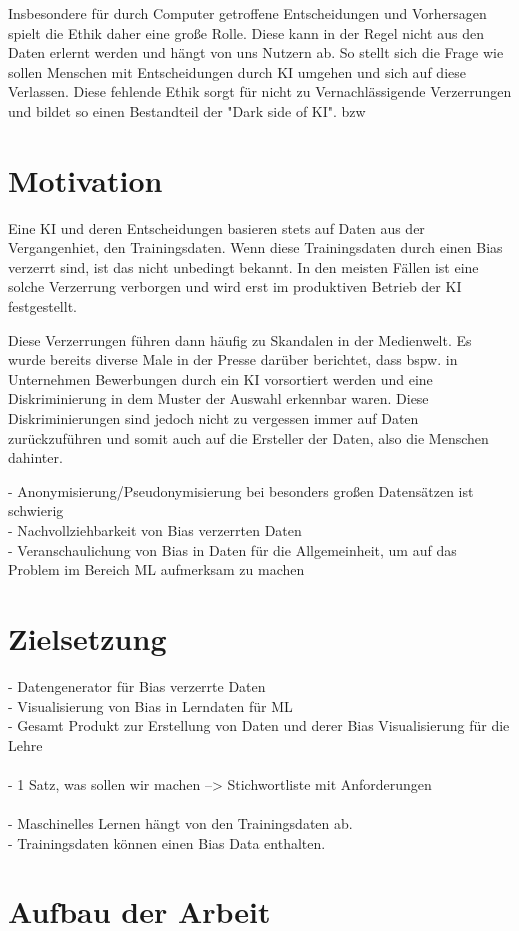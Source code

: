 \begin{onehalfspace}
        Insbesondere für durch Computer getroffene Entscheidungen und Vorhersagen spielt die Ethik daher eine große Rolle. Diese kann in der Regel nicht aus den Daten erlernt werden und hängt von uns Nutzern ab. So stellt sich die Frage wie sollen Menschen mit Entscheidungen durch \ac*{KI} umgehen und sich auf diese Verlassen. Diese fehlende Ethik sorgt für nicht zu Vernachlässigende Verzerrungen und bildet so einen Bestandteil der "Dark side of KI". \ac{bzw}

        \section{Motivation}
        \label{subsec:motivation}
        Eine \ac*{KI} und deren Entscheidungen basieren stets auf Daten aus der Vergangenhiet, den Trainingsdaten. Wenn diese Trainingsdaten durch einen Bias verzerrt sind, ist das nicht unbedingt bekannt. In den meisten Fällen ist eine solche Verzerrung verborgen und wird erst im produktiven Betrieb der \ac*{KI} festgestellt.
        
        Diese Verzerrungen führen dann häufig zu Skandalen in der Medienwelt. Es wurde bereits diverse Male in der Presse darüber berichtet, dass bspw. in Unternehmen Bewerbungen durch ein \ac*{KI} vorsortiert werden und eine Diskriminierung in dem Muster der Auswahl erkennbar waren. Diese Diskriminierungen sind jedoch nicht zu vergessen immer auf Daten zurückzuführen und somit auch auf die Ersteller der Daten, also die Menschen dahinter.

        -	Anonymisierung/Pseudonymisierung bei besonders gro{\ss}en Datensätzen ist schwierig \\
        -	Nachvollziehbarkeit von Bias verzerrten Daten \\
        -	Veranschaulichung von Bias in Daten für die Allgemeinheit, um auf das Problem im Bereich ML aufmerksam zu machen 

        \section{Zielsetzung}
        \label{subsec:zielsetzung}
        -	Datengenerator für Bias verzerrte Daten \\
        -	Visualisierung von Bias in Lerndaten für ML \\
        -	Gesamt Produkt zur Erstellung von Daten und derer Bias Visualisierung für die Lehre \\
        \\
        -   1 Satz, was sollen wir machen --> Stichwortliste mit Anforderungen \\
        \\
        -   Maschinelles Lernen hängt von den Trainingsdaten ab.\\
        -   Trainingsdaten können einen Bias Data enthalten.\\

        \section{Aufbau der Arbeit}
        \label{subsec:aufbau der arbeit}

        \newpage

    \end{onehalfspace}
